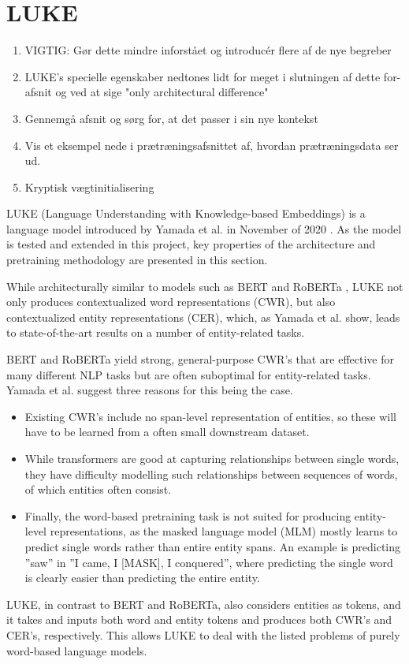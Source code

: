 \documentclass[main.tex]{subfiles}
\begin{document}
\section{LUKE}
\label{sec:LUKE}
\begin{enumerate}
    \item VIGTIG: Gør dette mindre inforstået og introducér flere af de nye begreber
    \item LUKE's specielle egenskaber nedtones lidt for meget i slutningen af dette for-afsnit og ved at sige "only architectural difference"
    \item Gennemgå afsnit og sørg for, at det passer i sin nye kontekst
    \item Vis et eksempel nede i prætræningsafsnittet af, hvordan prætræningsdata ser ud.
    \item Kryptisk vægtinitialisering
\end{enumerate}
LUKE (Language Understanding with Knowledge-based Embeddings) is a language model introduced by Yamada et al. in November of 2020 \cite{yamada2020luke}.
As the model is tested and extended in this project, key properties of the architecture and pretraining methodology are presented in this section.

While architecturally similar to models such as BERT \cite{devlin2019bert} and RoBERTa \cite{liu2019roberta}, LUKE not only produces contextualized word representations (CWR), but also contextualized entity representations (CER), which, as Yamada et al. show, leads to state-of-the-art results on a number of entity-related tasks.

BERT \cite{devlin2019bert} and RoBERTa \cite{liu2019roberta} yield strong, general-purpose CWR's that are effective for many different NLP tasks but are often suboptimal for entity-related tasks.
Yamada et al. suggest three reasons for this being the case.
\begin{itemize}
    \item Existing CWR's include no span-level representation of entities, so these will have to be learned from a often small downstream dataset.
    \item While transformers are good at capturing relationships between single words, they have difficulty modelling such relationships between sequences of words, of which entities often consist.
    \item Finally, the word-based pretraining task is not suited for producing entity-level representations, as the masked language model (MLM) mostly learns to predict single words rather than entire entity spans.
        An example is predicting ''saw'' in ''I came, I [MASK], I conquered'', where predicting the single word is clearly easier than predicting the entire entity.
\end{itemize}
LUKE, in contrast to BERT and RoBERTa, also considers entities as tokens, and it takes and inputs both word and entity tokens and produces both CWR's and CER's, respectively.
This allows LUKE to deal with the listed problems of purely word-based language models.
\end{document}
